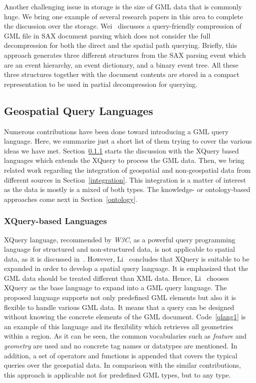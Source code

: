 \documentclass[a4paper,12pt]{article}
\begin{document}
Another challenging issue in storage is the size of GML data that is commonly huge. 
We bring one example of several research papers in this area to complete the discussion over the storage.
Wei~\cite{Wei2011} discusses a query-friendly compression of GML file in SAX document 
parsing which does not consider the full decompression for both the direct and the spatial path querying. 
Briefly, this approach generates three different structures from the SAX parsing event
which are an event hierarchy, an event dictionary, and a binary event tree.
All these three structures together with the document contents are stored in a compact
representation to be used in partial decompression for querying.%

\subsection{Geospatial Query Languages}
\label{queryLang}
Numerous contributions have been done toward introducing a GML query language.
Here, we summarize just a short list of them trying to cover the various ideas we have met. %
Section~\ref{xquery-based} starts the discussion with the XQuery based languages which extends the XQuery
to process the GML data.
Then, we bring related work regarding the integration of geospatial and non-geospatial
data from different sources in Section~\ref{integration}. This integration is a matter of interest
as the data is mostly is a mixed of both types. The knowledge- or ontology-based approaches 
come next in Section~\ref{ontology}.

\subsubsection{XQuery-based Languages}
\label{xquery-based}
XQuery language, recommended by \emph{W3C}, as a powerful query programming language for structured and non-structured data, 
is not applicable to spatial data, as it is discussed in~\cite{Lisa2006,Chen2010}. 
However, Li~\cite{Lisa2006} concludes that XQuery is suitable to be expanded in order to develop a spatial query language.
It is emphasized that the GML data should be treated different than XML data. Hence, Li~\cite{Lisa2006} chooses XQuery as the base language to expand into a GML query language. The proposed language supports not only predefined GML elements but also it is flexible to handle various GML data. 
It means that a query can be designed without knowing the concrete elements of the GML document.
Code~\ref{qlang1} is an example of this language and its flexibility
which retrieves all geometries within a region. As it can be seen, 
the common vocabularies such as \textit{feature} and \textit{geometry} are used and no concrete tag names or datatypes are mentioned.
In addition, a set of operators and functions is appended that covers the typical queries over the geospatial data. 
In comparison with the similar contributions, this approach is applicable not for predefined GML types, but to any type.
\end{document}
